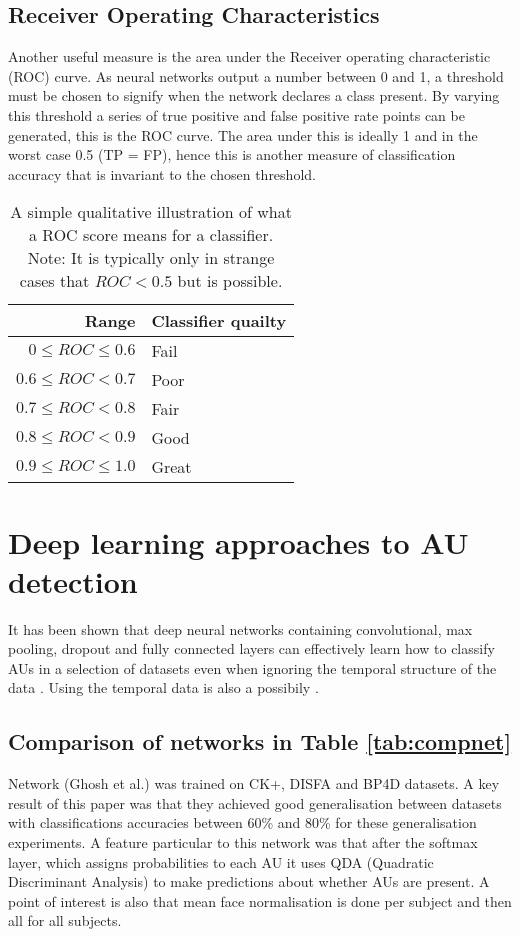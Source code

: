   \subsection{Receiver Operating Characteristics}
    Another useful measure is the area under the Receiver operating characteristic (ROC) curve.
    As neural networks output a number between 0 and 1, a threshold must be chosen to signify
    when the network declares a class present. By varying this threshold a series of true positive and false positive rate points
    can be generated, this is the ROC curve. The area under this is ideally 1 and in the worst case 0.5 (TP = FP), hence this is
    another measure of classification accuracy that is invariant to the chosen threshold.

    \begin{table}[]
      \centering \caption{A simple qualitative illustration of what a ROC score means for a classifier.
      Note: It is typically only in strange cases that $ROC< 0.5$ but is possible.} \label{my-label}
      \begin{tabular}{rl}
        \hline
        Range & Classifier quailty \\ \hline
        $0 \leq ROC \leq 0.6$   & Fail               \\
        $0.6 \leq ROC    < 0.7$   & Poor               \\
        $0.7 \leq ROC    < 0.8$   & Fair               \\
        $0.8 \leq ROC    < 0.9$   & Good               \\
        $0.9 \leq ROC \leq 1.0$   & Great              \\ \hline
      \end{tabular}
  \end{table}
  \section{Deep learning approaches to AU detection}
    It has been shown that deep neural networks containing convolutional, max pooling,
    dropout and fully connected layers can effectively learn how to classify AUs in
    a selection of datasets even when ignoring the temporal structure of the data \cite{Gudi2015,Ghosh2015,Khorrami2015}.
    Using the temporal data is also a possibily \cite{emonet,Jaiswal2016}.
    \subsection*{Comparison of networks in Table \ref{tab:compnet}}
    Network \cite{Ghosh2015} (Ghosh et al.) was trained on CK+, DISFA and BP4D datasets.
    A key result of this paper was that they achieved good generalisation between datasets
    with classifications accuracies between 60\% and 80\% for these generalisation experiments.
    A feature particular to this network was that after the softmax layer, which assigns probabilities
    to each AU it uses QDA (Quadratic Discriminant Analysis\cite{precogbook})  to
    make predictions about whether AUs are present. A point of interest is also that
    mean face normalisation is done per subject and then all for all subjects.

